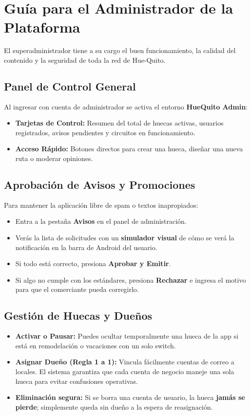 \documentclass[11pt, a4paper, oneside]{article}
\begin{document}
\section{Guía para el Administrador de la Plataforma}

El superadministrador tiene a su cargo el buen funcionamiento, la calidad del contenido y la seguridad de toda la red de Hue-Quito.

\subsection{Panel de Control General}
Al ingresar con cuenta de administrador se activa el entorno \textbf{HueQuito Admin}:
\begin{itemize}
  \item \textbf{Tarjetas de Control:} Resumen del total de huecas activas, usuarios registrados, avisos pendientes y circuitos en funcionamiento.
  \item \textbf{Acceso Rápido:} Botones directos para crear una hueca, diseñar una nueva ruta o moderar opiniones.
\end{itemize}

\subsection{Aprobación de Avisos y Promociones}
Para mantener la aplicación libre de spam o textos inapropiados:
\begin{itemize}
  \item Entra a la pestaña \textbf{Avisos} en el panel de administración.
  \item Verás la lista de solicitudes con un \textbf{simulador visual} de cómo se verá la notificación en la barra de Android del usuario.
  \item Si todo está correcto, presiona \textbf{Aprobar y Emitir}.
  \item Si algo no cumple con los estándares, presiona \textbf{Rechazar} e ingresa el motivo para que el comerciante pueda corregirlo.
\end{itemize}

\subsection{Gestión de Huecas y Dueños}
\begin{itemize}
  \item \textbf{Activar o Pausar:} Puedes ocultar temporalmente una hueca de la app si está en remodelación o vacaciones con un solo switch.
  \item \textbf{Asignar Dueño (Regla 1 a 1):} Vincula fácilmente cuentas de correo a locales. El sistema garantiza que cada cuenta de negocio maneje una sola hueca para evitar confusiones operativas.
  \item \textbf{Eliminación segura:} Si se borra una cuenta de usuario, la hueca \textbf{jamás se pierde}; simplemente queda sin dueño a la espera de reasignación.
\end{itemize}
\end{document}
